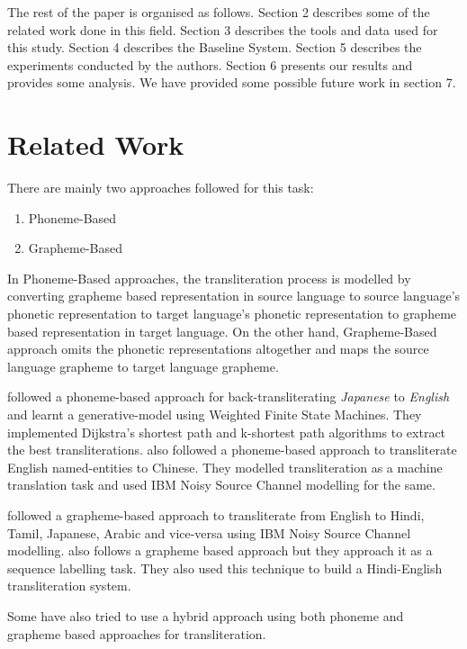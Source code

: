 \documentclass[11pt,a4paper]{article}
\begin{document}
\par
The rest of the paper is organised as follows. Section 2 describes some of the related work done in this field. Section 3 describes the tools and data used for this study. Section 4 describes the Baseline System. Section 5 describes the experiments conducted by the authors. Section 6 presents our results and provides some analysis. We have provided some possible future work in section 7.

\section{Related Work}
There are mainly two approaches followed for this task:
\begin{enumerate}
\item Phoneme-Based
\item Grapheme-Based
\end{enumerate}
In Phoneme-Based approaches, the transliteration process is modelled by converting grapheme based representation in source language to source language's phonetic representation to target language's phonetic representation to grapheme based representation in target language. On the other hand, Grapheme-Based approach omits the phonetic representations altogether and maps the source language grapheme to target language grapheme.
\par
\citet*{knight-graehl-1} followed a phoneme-based approach for back-transliterating \textit{Japanese} to \textit{English} and learnt a generative-model using Weighted Finite State Machines. They implemented Dijkstra's shortest path and k-shortest path algorithms to extract the best transliterations. \citet*{virga-khudanpur-1} also followed a phoneme-based approach to transliterate English named-entities to Chinese. They modelled transliteration as a machine translation task and used IBM Noisy Source Channel modelling for the same.
\par
\citet*{kumaran-1} followed a grapheme-based approach to transliterate from English to {Hindi, Tamil, Japanese, Arabic} and vice-versa using IBM Noisy Source Channel modelling. \citet*{ganesh-1} also follows a grapheme based approach but they approach it as a sequence labelling  task. They also used this technique to build a Hindi-English transliteration system. 
\par
Some \citet*{oh-hybrid-1} have also tried to use a hybrid approach using both phoneme and grapheme based approaches for transliteration.
\par
\end{document}
